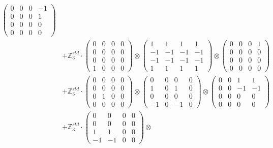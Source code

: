 \documentclass{article}
\begin{document}
{\begin{align}
            \begin{pmatrix} 0 & 0 & 0 & -1 \\ 0 & 0 & 0 & 1 \\ 0 & 0 & 0 & 0 \\ 0 & 0 & 0 & 0 \end{pmatrix} \\ 
        &+ \label{Rs16-Rc11-Strassen-1-c25} \mathbb{Z}_3^{std} \cdot 
            \begin{pmatrix} 0 & 0 & 0 & 0 \\ 0 & 0 & 0 & 0 \\ 0 & 0 & 0 & 0 \\ 1 & 0 & 0 & 0 \end{pmatrix} \otimes 
            \begin{pmatrix} 1 & 1 & 1 & 1 \\ -1 & -1 & -1 & -1 \\ -1 & -1 & -1 & -1 \\ 1 & 1 & 1 & 1 \end{pmatrix} \otimes 
            \begin{pmatrix} 0 & 0 & 0 & 1 \\ 0 & 0 & 0 & 0 \\ 0 & 0 & 0 & 0 \\ 0 & 0 & 0 & 0 \end{pmatrix} \\ 
        &+ \label{Rs16-Rc11-Strassen-1-c26} \mathbb{Z}_3^{std} \cdot 
            \begin{pmatrix} 0 & 0 & 0 & 0 \\ 0 & 0 & 0 & 0 \\ 0 & 1 & 0 & 0 \\ 0 & 0 & 0 & 0 \end{pmatrix} \otimes 
            \begin{pmatrix} 0 & 0 & 0 & 0 \\ 1 & 0 & 1 & 0 \\ 0 & 0 & 0 & 0 \\ -1 & 0 & -1 & 0 \end{pmatrix} \otimes 
            \begin{pmatrix} 0 & 0 & 1 & 1 \\ 0 & 0 & -1 & -1 \\ 0 & 0 & 0 & 0 \\ 0 & 0 & 0 & 0 \end{pmatrix} \\ 
        &+ \label{Rs16-Rc11-Strassen-1-c27} \mathbb{Z}_3^{std} \cdot 
            \begin{pmatrix} 0 & 0 & 0 & 0 \\ 0 & 0 & 0 & 0 \\ 1 & 1 & 0 & 0 \\ -1 & -1 & 0 & 0 \end{pmatrix} \otimes 

\end{align}}
\end{document}
